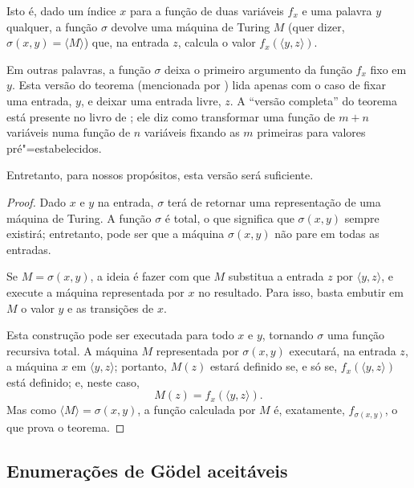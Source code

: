 Isto é,
dado um índice $x$ para a função de duas variáveis $f_x$
e uma palavra $y$ qualquer,
a função $\sigma$ devolve uma máquina de Turing $M$
(quer dizer, $\sigma(x, y) = \langle M \rangle$)
que, na entrada $z$,
calcula o valor $f_x(\langle y, z \rangle)$.

Em outras palavras,
a função $\sigma$ deixa o primeiro argumento da função $f_x$
fixo em $y$.
Esta versão do teorema
(mencionada por )
lida apenas com o caso de fixar uma entrada, $y$,
e deixar uma entrada livre, $z$.
A ``versão completa'' do teorema
está presente no livro de ;
ele diz como transformar uma função de $m + n$ variáveis
numa função de $n$ variáveis
fixando as $m$ primeiras para valores pré"=estabelecidos.

Entretanto, para nossos propósitos,
esta versão será suficiente.

\begin{proof}
    Dado $x$ e $y$ na entrada,
    $\sigma$ terá de retornar uma representação de uma máquina de Turing.
    A função $\sigma$ é total,
    o que significa que $\sigma(x, y)$ sempre existirá;
    entretanto,
    pode ser que a máquina $\sigma(x, y)$ não pare em todas as entradas.

    Se $M = \sigma(x, y)$,
    a ideia é fazer com que $M$ substitua a entrada $z$ por $\langle y, z \rangle$,
    e execute a máquina representada por $x$ no resultado.
    Para isso,
    basta embutir em $M$ o valor $y$ e as transições de $x$.

    Esta construção pode ser executada para todo $x$ e $y$,
    tornando $\sigma$ uma função recursiva total.
    A máquina $M$ representada por $\sigma(x, y)$ executará,
    na entrada $z$, a máquina $x$ em $\langle y, z \rangle$;
    portanto,
    $M(z)$ estará definido se, e só se, $f_x(\langle y, z \rangle)$ está definido;
    e, neste caso,
    \begin{equation*}
        M(z) = f_x( \langle y, z \rangle ).
    \end{equation*}
    Mas como $\langle M \rangle = \sigma(x, y)$,
    a função calculada por $M$ é, exatamente, $f_{\sigma(x, y)}$,
    o que prova o teorema.
\end{proof}

\subsection{Enumerações de Gödel aceitáveis}
\label{sec:acceptable_godel_numbering}

